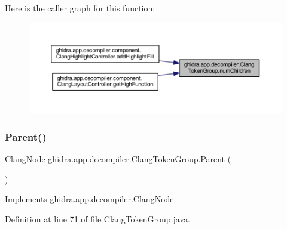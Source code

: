 Here is the caller graph for this function\+:
\nopagebreak
\begin{figure}[H]
\begin{center}
\leavevmode
\includegraphics[width=350pt]{classghidra_1_1app_1_1decompiler_1_1_clang_token_group_a68d733e3de7a23187bc6e17891b01a63_icgraph}
\end{center}
\end{figure}
\mbox{\label{classghidra_1_1app_1_1decompiler_1_1_clang_token_group_a3f9dca7140c0110a3fa83c4b81f7886e}} 
\subsubsection{\texorpdfstring{Parent()}{Parent()}}
{\footnotesize\ttfamily \mbox{\hyperlink{interfaceghidra_1_1app_1_1decompiler_1_1_clang_node}{Clang\+Node}} ghidra.\+app.\+decompiler.\+Clang\+Token\+Group.\+Parent (\begin{DoxyParamCaption}{ }\end{DoxyParamCaption})\hspace{0.3cm}{\ttfamily [inline]}}



Implements \mbox{\hyperlink{interfaceghidra_1_1app_1_1decompiler_1_1_clang_node_a27b0287e5069850a61b4312f7d2737a4}{ghidra.\+app.\+decompiler.\+Clang\+Node}}.



Definition at line 71 of file Clang\+Token\+Group.\+java.

